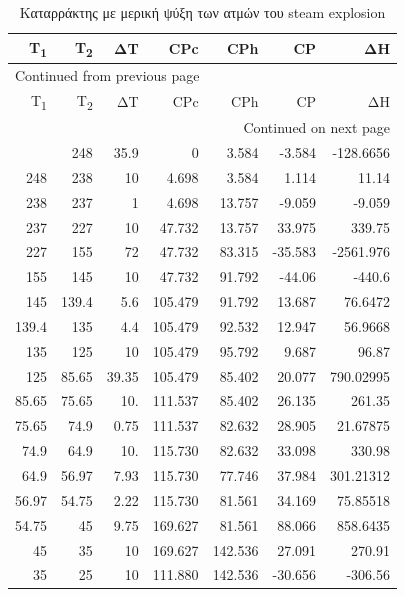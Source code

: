 \documentclass[11pt]{article}
\begin{document}
\begin{longtable}{rrrrrrr}
\caption{Καταρράκτης με μερική ψύξη των ατμών του steam explosion}
\\
Τ\textsubscript{1} & T\textsubscript{2} & ΔΤ & CPc & CPh & CP & ΔΗ\\
\hline
\endfirsthead
\multicolumn{7}{l}{Continued from previous page} \\
\hline

Τ\textsubscript{1} & T\textsubscript{2} & ΔΤ & CPc & CPh & CP & ΔΗ \\

\hline
\endhead
\hline\multicolumn{7}{r}{Continued on next page} \\
\endfoot
\endlastfoot
\hline
283.9 & 248 & 35.9 & 0 & 3.584 & -3.584 & -128.6656\\
248 & 238 & 10 & 4.698 & 3.584 & 1.114 & 11.14\\
238 & 237 & 1 & 4.698 & 13.757 & -9.059 & -9.059\\
237 & 227 & 10 & 47.732 & 13.757 & 33.975 & 339.75\\
227 & 155 & 72 & 47.732 & 83.315 & -35.583 & -2561.976\\
155 & 145 & 10 & 47.732 & 91.792 & -44.06 & -440.6\\
145 & 139.4 & 5.6 & 105.479 & 91.792 & 13.687 & 76.6472\\
139.4 & 135 & 4.4 & 105.479 & 92.532 & 12.947 & 56.9668\\
135 & 125 & 10 & 105.479 & 95.792 & 9.687 & 96.87\\
125 & 85.65 & 39.35 & 105.479 & 85.402 & 20.077 & 790.02995\\
85.65 & 75.65 & 10. & 111.537 & 85.402 & 26.135 & 261.35\\
75.65 & 74.9 & 0.75 & 111.537 & 82.632 & 28.905 & 21.67875\\
74.9 & 64.9 & 10. & 115.730 & 82.632 & 33.098 & 330.98\\
64.9 & 56.97 & 7.93 & 115.730 & 77.746 & 37.984 & 301.21312\\
56.97 & 54.75 & 2.22 & 115.730 & 81.561 & 34.169 & 75.85518\\
54.75 & 45 & 9.75 & 169.627 & 81.561 & 88.066 & 858.6435\\
45 & 35 & 10 & 169.627 & 142.536 & 27.091 & 270.91\\
35 & 25 & 10 & 111.880 & 142.536 & -30.656 & -306.56\\
\end{longtable}

\pagebreak
\end{document}
